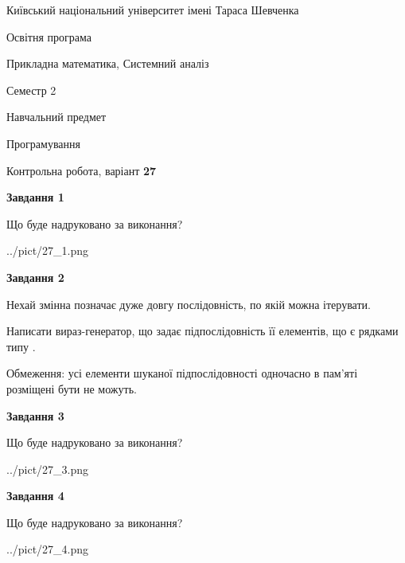\documentclass[12pt, ukrainian]{article}
\begin{document}
{{\begin {small}\par
{ \center  Київський національний університет імені Тараса Шевченка \par}
{\parbox {5 cm}{Освітня програма \hfill}{\parbox {8 cm}{Прикладна математика, Системний аналіз \hfill}}\parbox {5 cm}{\hfill Семестр 2}}\par
{\parbox {5 cm} {Навчальний предмет \hfill}\parbox {7 cm}{Програмування \hfill}\parbox {6cm}{\hfill}\par}\vspace{-7pt} \end{small}}{\center Контрольна робота, варіант  \No \textbf
{ 27 }\par}}
{
\begin {large}
{\begin {center}\textbf{Завдання 1}\end {center}}\par
Що буде надруковано за виконання?\par\par
\begin{center}
	{../pict/27_1.png}
\end{center}
\newpage

{\begin {center}\textbf{Завдання 2}\end {center}}\par
Нехай змінна  позначає дуже довгу послідовність, по якій можна ітерувати.

Написати вираз-генератор, що задає підпослідовність її елементів, що є рядками типу .

Обмеження: усі елементи шуканої підпослідовності одночасно в пам'яті розміщені бути не можуть.\par
\newpage

{\begin {center}\textbf{Завдання 3}\end {center}}\par
Що буде надруковано за виконання?\par
\begin{center}
	{../pict/27_3.png}
\end{center}
\newpage

{\begin {center}\textbf{Завдання 4}\end {center}}\par
Що буде надруковано за виконання?\par
\begin{center}
	{../pict/27_4.png}
\end{center}
\newpage


\end{large}}
\end{document}
